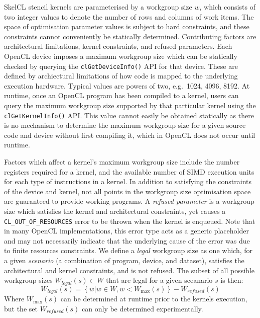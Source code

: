 \documentclass[nonatbib,preprint,9pt]{sigplanconf}
\begin{document}
SkelCL stencil kernels are parameterised by a workgroup size $w$,
which consists of two integer values to denote the number of rows and
columns of work items. The space of optimisation parameter values is
subject to hard constraints, and these constraints cannot conveniently
be statically determined. Contributing factors are architectural
limitations, kernel constraints, and refused parameters.  Each OpenCL
device imposes a maximum workgroup size which can be statically
checked by querying the \texttt{clGetDeviceInfo()} API for that
device. These are defined by archiectural limitations of how code is
mapped to the underlying execution hardware. Typical values are powers
of two, e.g.\ 1024, 4096, 8192. At runtime, once an OpenCL program has
been compiled to a kernel, users can query the maximum workgroup size
supported by that particular kernel using the
\texttt{clGetKernelInfo()} API. This value cannot easily be obtained
statically as there is no mechanism to determine the maximum workgroup
size for a given source code and device without first compiling it,
which in OpenCL does not occur until runtime.

Factors which affect a kernel's maximum workgroup size include the
number registers required for a kernel, and the available number of
SIMD execution units for each type of instructions in a kernel. In
addition to satisfying the constraints of the device and kernel, not
all points in the workgroup size optimisation space are guaranteed to
provide working programs. A \emph{refused parameter} is a workgroup
size which satisfies the kernel and architectural constraints, yet
causes a \texttt{CL\_OUT\_OF\_RESOURCES} error to be thrown when the
kernel is enqueued. Note that in many OpenCL implementations, this
error type acts as a generic placeholder and may not necessarily
indicate that the underlying cause of the error was due to finite
resources constraints. We define a \emph{legal} workgroup size as one
which, for a given \emph{scenario} (a combination of program, device,
and dataset), satisfies the architectural and kernel constraints, and
is not refused. The subset of all possible workgroup sizes
$W_{legal}(s) \subset W$ that are legal for a given sceanario $s$ is
then:
%
\begin{equation}
  W_{legal}(s) = \left\{w | w \in W, w < W_{\max}(s) \right\} - W_{refused}(s)
\end{equation}
%
Where $W_{\max}(s)$ can be determined at runtime prior to the kernels
execution, but the set $W_{refused}(s)$ can only be determined
experimentally.
\end{document}
